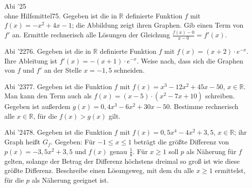 \documentclass[11pt]{article}
\begin{document}
\pfgruppe{}
\begin{pfaufg}{Abi ’25\\ohne Hilfsmittel}{75.}{}
Gegeben ist die in $\mathbb{R}$ definierte Funktion $f$ mit $f(x) = -x^2 + 4x - 1$; die Abbildung zeigt ihren Graphen. Gib einen Term von $f'$ an. Ermittle rechnerisch alle Lösungen der Gleichung $\tfrac{f(x) - 0}{x - 0} = f'(x)$.
\par\smallskip\noindent {}\par
{}
\end{pfaufg}
\pfgruppe{}
\begin{pfaufg}{Abi ’22}{76.}{}
Gegeben ist die in $\mathbb{R}$ definierte Funktion $f$ mit $f(x) = (x + 2)\cdot e^{-x}$. Ihre Ableitung ist $f'(x) = -(x + 1)\cdot e^{-x}$. Weise nach, dass sich die Graphen von $f$ und $f'$ an der Stelle $x = -1{,}5$ schneiden.
\end{pfaufg}
\pfgruppe{}
\begin{pfaufg}{Abi ’23}{77.}{}
Gegeben ist die Funktion $f$ mit $f(x) = x^3 - 12x^2 + 45x - 50$, $x \in \mathbb{R}$. Man kann den Term auch als $f(x) = (x - 5)\cdot(x^2 - 7x + 10)$ schreiben. Gegeben ist außerdem $g(x) = 0{,}4x^3 - 6x^2 + 30x - 50$. Bestimme rechnerisch alle $x \in \mathbb{R}$, für die $f(x) > g(x)$ gilt.
\end{pfaufg}
\pfgruppe{}
\begin{pfaufg}{Abi ’24}{78.}{}
Gegeben ist die Funktion $f$ mit $f(x) = 0{,}5x^4 - 4x^2 + 3{,}5$, $x \in \mathbb{R}$; ihr Graph heißt $G_f$. Gegeben: Für $-1 \le x \le 1$ beträgt die größte Differenz von $p(x) = -3{,}5x^2 + 3{,}5$ und $f(x)$ genau $\tfrac{1}{8}$. Für $x \ge 1$ soll $p$ als Näherung für $f$ gelten, solange der Betrag der Differenz höchstens dreimal so groß ist wie diese größte Differenz. Beschreibe einen Lösungsweg, mit dem du alle $x \ge 1$ ermittelst, für die $p$ als Näherung geeignet ist.
\end{pfaufg}
\end{document}
